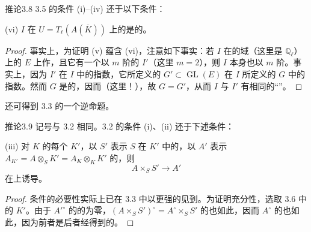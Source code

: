 \begin{SGAresult}{推论}{3.8}
3.5 的条件 (i)--(iv) 还于以下条件：

 (vi) $I$ 在 $U=T_\ell(A(\overline K))$ 上的是的。
\end{SGAresult}
\begin{proof}
事实上，为证明 (v) 蕴含 (vi)，注意如下事实：若 $I$ 在的域（这里是 $\mathbb Q_\ell$）上的 $E$ 上作，且它有一个以 $m$ 阶的 $I'$（这里 $m=2$），则 $I$ 本身也以 $m$ 阶。事实上，因为 $I'$ 在 $I$ 中的指数，它所定义的 $G'\subset\operatorname{GL}(E)$ 在 $I$ 所定义的 $G$ 中的指数。然而 $G$ 是的，因而（这里！），故 $G=G'$，从而 $I$ 与 $I'$ 有相同的“”。
\end{proof}
还可得到 3.3 的一个逆命题。
\begin{SGAresult}{推论}{3.9}
记号与 3.2 相同。3.2 的条件 (i)、(ii) 还于下述条件：

 (iii) 对 $K$ 的每个 $K'$，以 $S'$ 表示 $S$ 在 $K'$ 中的，以 $A'$ 表示 $A_{K'}=A\otimes_SK'=A_K\otimes_KK'$ 的，则
\[
 A\times_SS'\longrightarrow A'
\]
在上诱导。
\end{SGAresult}
\begin{proof}
条件的必要性实际上已在 3.3 中以更强的见到。为证明充分性，选取 3.6 中的 $K'$。由于 $A'^\circ$ 的的为零，$(A\times_SS')^\circ=A^\circ\times_SS'$ 的也如此，因而 $A^\circ$ 的也如此，因为前者是后者经得到的。
\end{proof}

